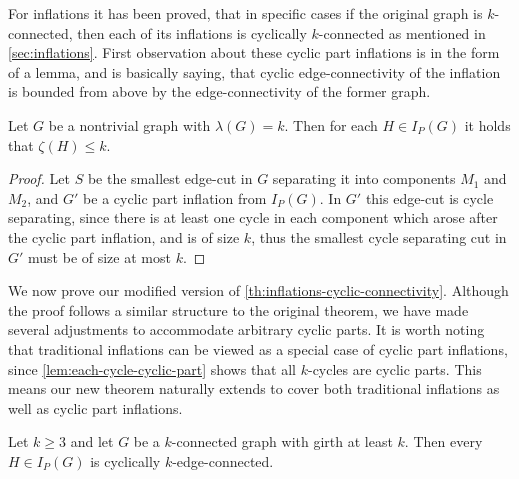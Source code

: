 \documentclass[12pt, twoside]{book}
\begin{document}
For inflations it has been proved, that in specific cases if the original graph is $k$-connected, then each of its inflations is cyclically $k$-connected as mentioned in \cref{sec:inflations}. First observation about these cyclic part inflations is in the form of a lemma, and is basically saying, that cyclic edge-connectivity of the inflation is bounded from above by the edge-connectivity of the former graph.

\begin{lemma}
	Let $G$ be a nontrivial graph with $\lambda(G)=k$. Then for each $H\in I_P(G)$ it holds that $\zeta(H)\leq k$.
\end{lemma}

\begin{proof}
	Let $S$ be the smallest edge-cut in $G$ separating it into components $M_1$ and $M_2$, and $G'$ be a cyclic part inflation from $I_P(G)$. In $G'$ this edge-cut is cycle separating, since there is at least one cycle in each component which arose after the cyclic part inflation, and is of size $k$, thus the smallest cycle separating cut in $G'$ must be of size at most $k$.
\end{proof}

We now prove our modified version of \cref{th:inflations-cyclic-connectivity}. Although the proof follows a similar structure to the original theorem, we have made several adjustments to accommodate arbitrary cyclic parts. It is worth noting that traditional inflations can be viewed as a special case of cyclic part inflations, since \cref{lem:each-cycle-cyclic-part} shows that all $k$-cycles are cyclic parts. This means our new theorem naturally extends to cover both traditional inflations as well as cyclic part inflations.

\begin{theorem}\label{th:cyclic-part-inflations}
	Let $k\geq 3$ and let $G$ be a $k$-connected graph with girth at least $k$. Then every  $H\in I_P(G)$ is cyclically $k$-edge-connected.
\end{theorem}
\end{document}
